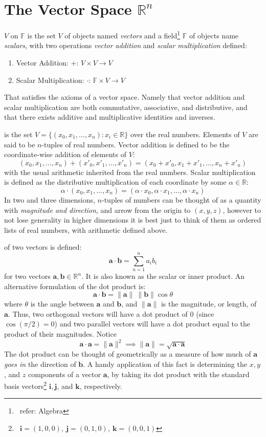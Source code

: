 \documentclass[10pt]{book}
\newcommand{\newthought}[1]{\vspace{0.5\baselineskip}\noindent{\scshape #1}}
\begin{document}
\section{The Vector Space $\mathbb{R}^n$}
\newthought{A vector space} $V$ on $\mathbb{F}$ is the set $V$ of objects named \emph{vectors} and a
field\footnote{\ refer: Algebra}
$\mathbb{F}$ of objects name \emph{scalars}, with two operations \emph{vector addition} and \emph{scalar
multiplication} defined:
\begin{enumerate}
  \item Vector Addition: $+$: $V \times V \to V$
  \item Scalar Multiplication: $\cdot$: $\mathbb{F} \times V \to V$
\end{enumerate}
That satisfies the axioms of a vector space. Namely that vector addition and scalar multiplication are both
commutative, associative,
and distributive, and that there exists additive and multiplicative identities and inverses.

\newthought{The vector space $\mathbb{R}^n$} is the set $V = \{ (x_0, x_1, \ldots, x_n) : x_i \in
\mathbb{R}\}$ over the real numbers.
Elements of $V$ are said to be $n$-tuples of real numbers. Vector addition is defined to be the
coordinate-wise addition of elements
of $V$:
\[(x_0, x_1, \ldots, x_n) + (x'_0, x'_1, \ldots, x'_n) = (x_0 + x'_0, x_1 + x'_1, \ldots, x_n + x'_n)\]
with the usual arithmetic inherited from the real numbers. Scalar multiplication is defined as the
distributive multiplication of each
coordinate by some $\alpha \in \mathbb{R}$:
\[\alpha \cdot (x_0, x_1, \ldots, x_n) = (\alpha \cdot x_0, \alpha \cdot x_1, \ldots, \alpha \cdot x_n)\]
In two and three dimensions, $n$-tuples of numbers can be thought of as a quantity with \emph{magnitude and
direction}, and arrow
from the origin to $(x,y,z)$, however to not lose generality in higher dimensions it is best just to think of
them as ordered lists of
real numbers, with arithmetic defined above.

\newthought{The dot product} of two vectors is defined:
\[\mathbf{a} \cdot \mathbf{b} = \sum_{n=1}^{n}a_i b_i\]
for two vectors $\mathbf{a}, \mathbf{b} \in \mathbb{R}^n$. It is also known as the scalar or inner product.
An alternative
formulation of the dot product is:
\[\mathbf{a} \cdot \mathbf{b} = \|\mathbf{a}\|\ \|\mathbf{b}\| \cos\theta\]
where $\theta$ is the angle between $\mathbf{a}$ and $\mathbf{b}$, and $\|\mathbf{a}\|$ is the magnitude, or
length, of $\mathbf{a}$.
Thus, two orthogonal vectors will have a dot product of 0 (since $\cos(\pi / 2) = 0$) and two parallel
vectors will have a dot product
equal to the product of their magnitudes. Notice
\[\mathbf{a} \cdot \mathbf{a} = \|\mathbf{a}\|^2 \implies \|\mathbf{a}\| = \sqrt{\mathbf{a} \cdot \mathbf{a}}\]
The dot product can be thought of geometrically as a measure of how much of $\mathbf{a}$ \emph{goes in} the
direction of $\mathbf{b}$.
A handy application of this fact is determining the $x, y$, and $z$ components of a vector $\mathbf{a}$, by
taking its dot product with
the standard basis vectors\footnote{\ $\mathbf{i} = (1,0,0),\ \mathbf{j} = (0,1,0),\ \mathbf{k} = (0,0,1)$}
$\mathbf{i}, \mathbf{j}$, and
$\mathbf{k}$, respectively.
\end{document}
